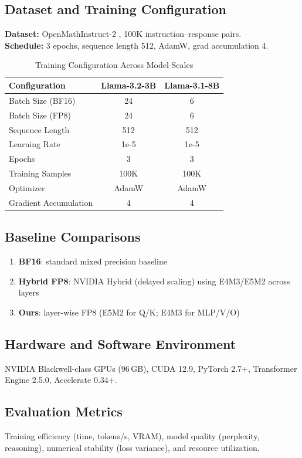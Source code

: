 \documentclass[conference]{IEEEtran}
\begin{document}
\subsection{Dataset and Training Configuration}
\textbf{Dataset:} OpenMathInstruct-2 \cite{toshniwal2024openmath2}, 100K instruction–response pairs.\\
\textbf{Schedule:} 3 epochs, sequence length 512, AdamW, grad accumulation 4.
\begin{table}[htbp]
\centering
\caption{Training Configuration Across Model Scales}
\begin{tabular}{@{}lcc@{}}
\toprule
\textbf{Configuration} & \textbf{Llama-3.2-3B} & \textbf{Llama-3.1-8B} \\
\midrule
Batch Size (BF16) & 24 & 6 \\
Batch Size (FP8) & 24 & 6 \\
Sequence Length & 512 & 512 \\
Learning Rate & 1e-5 & 1e-5 \\
Epochs & 3 & 3 \\
Training Samples & 100K & 100K \\
Optimizer & AdamW & AdamW \\
Gradient Accumulation & 4 & 4 \\
\bottomrule
\end{tabular}
\label{tab:training_config}
\end{table}

\subsection{Baseline Comparisons}
\begin{enumerate}
\item \textbf{BF16}: standard mixed precision baseline \cite{kalamkar2019study}
\item \textbf{Hybrid FP8}: NVIDIA Hybrid (delayed scaling) using E4M3/E5M2 across layers \cite{nvidia2024mxfp8,TE2025}
\item \textbf{Ours}: layer-wise FP8 (E5M2 for Q/K; E4M3 for MLP/V/O)
\end{enumerate}

\subsection{Hardware and Software Environment}
NVIDIA Blackwell-class GPUs (96\,GB), CUDA 12.9, PyTorch 2.7+, Transformer Engine 2.5.0, Accelerate 0.34+.

\subsection{Evaluation Metrics}
Training efficiency (time, tokens/s, VRAM), model quality (perplexity, reasoning), numerical stability (loss variance), and resource utilization.
\end{document}
